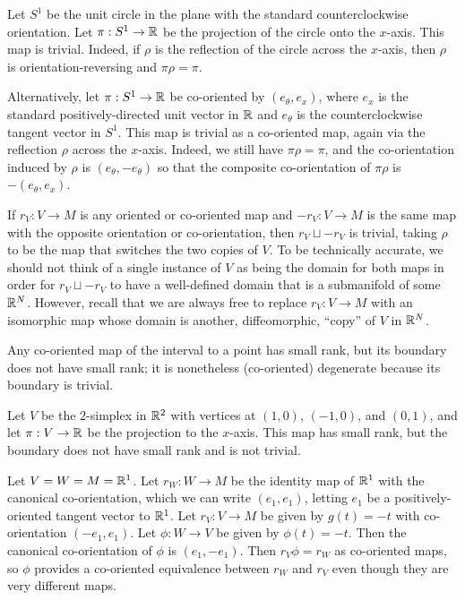 \begin{example}
Let $S^1$ be the unit circle in the plane with the standard counterclockwise orientation. Let $\pi: S^1\to \mathbb{R}$ be the projection of the circle onto the $x$-axis. This map is trivial. Indeed, if $\rho$ is the reflection of the circle across the $x$-axis, then $\rho$ is orientation-reversing and $\pi \rho=\pi$.

Alternatively, let $\pi:S^1\to \mathbb{R}$ be co-oriented by $(e_\theta,e_x)$, where $e_x$ is the standard positively-directed unit vector in $\mathbb{R}$ and $e_\theta$ is the counterclockwise tangent vector in $S^1$. This map is trivial as a co-oriented map, again via the reflection $\rho$ across the $x$-axis. Indeed, we still have $\pi \rho=\pi$, and the co-orientation induced by $\rho$ is $(e_\theta,-e_\theta)$ so that the composite co-orientation of $\pi\rho$ is $-(e_\theta,e_x)$.
\end{example}

\begin{example}
If $r_V:V\to M$ is any oriented or co-oriented map and $-r_V:V\to M$ is the same map with the opposite orientation or co-orientation, then $r_V \sqcup -r_V$ is trivial, taking $\rho$ to be the map that switches the two copies of $V$. To be technically accurate, we should not think of a single instance of $V$ as being the domain for both maps in order for $r_V \sqcup -r_V$ to have a well-defined domain that is a submanifold of some $\mathbb{R}^N$. However, recall that we are always free to replace $r_V:V\to M$ with an isomorphic map whose domain is another, diffeomorphic,  ``copy'' of $V$ in $\mathbb{R}^N$.
\end{example}



\begin{example}
Any co-oriented map of the interval to a point has small rank, but its boundary does not have small rank; it is nonetheless (co-oriented) degenerate because its boundary is trivial.
\end{example}

\begin{example}\label{E: projected triangle}
Let $V$ be the $2$-simplex in $\mathbb{R}^2$ with vertices at $(1,0)$, $(-1,0)$, and $(0,1)$, and let $\pi:V\to \mathbb{R}$ be the projection to the $x$-axis. This map has small rank, but the boundary does not have small rank and is not trivial.
\end{example}


\begin{example}
Let $V=W=M=\mathbb{R}^1$. Let $r_W:W\to M$ be the identity map of $\mathbb{R}^1$ with the canonical co-orientation, which we can write $(e_1,e_1)$, letting $e_1$ be a positively-oriented tangent vector to $\mathbb{R}^1$. Let $r_V:V\to M$ be given by $g(t)=-t$ with co-orientation $(-e_1,e_1)$.  Let $\phi:W\to V$ be given by $\phi(t)=-t$. Then the canonical co-orientation of $\phi$ is $(e_1,-e_1)$. Then $r_V\phi=r_W$ as co-oriented maps, so $\phi$ provides a co-oriented equivalence between $r_W$ and $r_V$ even though they are very different maps.
\end{example}



